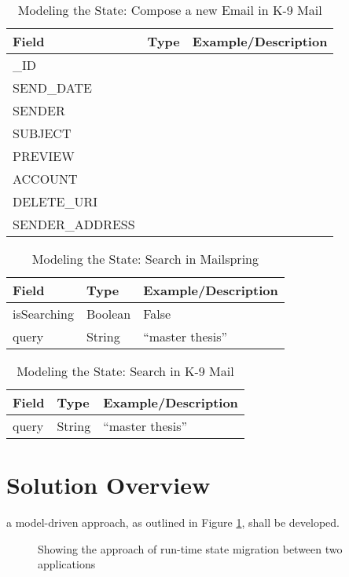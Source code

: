 \newpage
\begin{table}[ht!]
\begin{tabular}{lll}
Field     & Type      & Example/Description \\
\hline
\_ID            &  &  \\
SEND\_DATE      &      &                     \\
SENDER         &      &                     \\
SUBJECT        &      &                     \\
PREVIEW        &      &                     \\
ACCOUNT        &      &                     \\
DELETE\_URI     &      &                     \\
SENDER\_ADDRESS &      &                    
\end{tabular}
\caption{Modeling the State: Compose a new Email in K-9 Mail}
\label{tab:compose_new_email_k9}
\end{table}


\begin{table}[ht!]
\begin{tabular}{lll}
Field       & Type    & Example/Description \\
\hline
isSearching & Boolean & False               \\
query       & String  & “master   thesis”  
\end{tabular}
\caption{Modeling the State: Search in Mailspring}
\label{tab:search_mailspring}
\end{table}


\begin{table}[ht!]
\begin{tabular}{lll}
Field & Type   & Example/Description \\
\hline
query & String & “master thesis”    
\end{tabular}
\caption{Modeling the State: Search in K-9 Mail}
\label{tab:search-k9}
\end{table}

\section{Solution Overview}
a model-driven approach, as outlined in Figure \ref{fig:solution}, shall be developed. 

\begin{figure}[!b]
    
    \caption{Showing the approach of run-time state migration between two applications }
    \label{fig:solution}
\end{figure}

\newpage